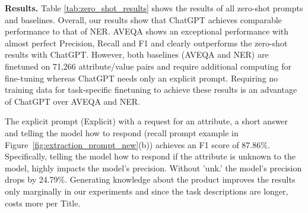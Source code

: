 
\vspace{.2cm}\noindent\textbf{Results.}
Table \ref{tab:zero_shot_results} shows the results of all zero-shot prompts and baselines.
Overall, our results show that ChatGPT achieves %
comparable performance to that of NER.
AVEQA shows an exceptional performance with almost perfect Precision, Recall and F1 %
and clearly outperforms the zero-shot results with ChatGPT.
However, both baselines (AVEQA and NER) are finetuned on 71,266 attribute/value pairs and require additional computing for fine-tuning whereas ChatGPT needs only an explicit prompt.
Requiring no training data for task-specific finetuning to achieve these results is an advantage of ChatGPT over AVEQA and NER.

The explicit prompt (Explicit) with a request for an attribute, a short answer and telling the model how to respond (recall prompt example in Figure~\ref{fig:extraction_prompt_new}(b)) achieves an F1 score of 87.86\%.
Specifically, telling the model how to respond if the attribute is unknown to the model, highly impacts the model's precision. Without 'unk.' the model's precision drops by 24.79\%.
Generating knowledge about the product improves the results only marginally in our experiments and since the task descriptions are longer, costs more per Title.

